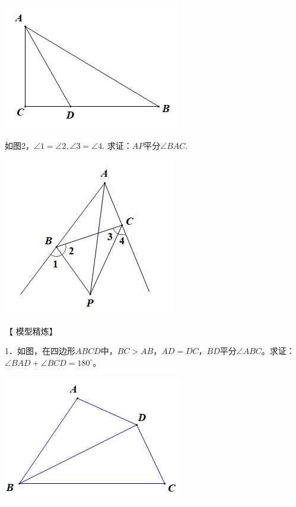 \documentclass[10pt]{ctexart}
\begin{document}
\begin{flushright}
	\includegraphics[scale=0.6]{figure/jiaopfxian02}
\end{flushright}

\begin{shaded}
	\begin{example}
	如图2，$\angle 1=\angle 2,\angle 3=\angle 4$. 求证：$AP$平分$\angle BAC$.
	\end{example}
\end{shaded}

\begin{flushright}
	\includegraphics[scale=0.6]{figure/jiaopfxian03}
\end{flushright}


【 {\heiti 模型精炼}】
\begin{shaded}
	1．如图，在四边形$ABCD$中，$BC>AB$，$AD=DC$，$BD$平分$\angle ABC$。求证：$\angle BAD+\angle BCD=180^\circ$。
\end{shaded}

\begin{flushright}
	\includegraphics[scale=0.6]{figure/jiaopfxian04}
\end{flushright}
\end{document}
